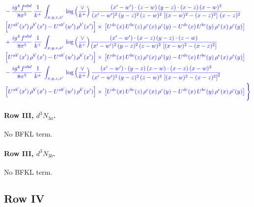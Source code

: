 \documentclass[10pt]{article}
\numberwithin{equation}{section}
\newcommand{\new}[1]{{\color{blue}#1}}
\newcommand{\nc}{\color{blue}}
\begin{document}
\begin{align}
& \nc  - \frac{ig^{4}\, f^{abd}}{8\pi^{5}}\, \frac{1}{k^{+}}\, \int_{x,y,z,x'}\,\new{\log{\left(\frac{\vee}{k^{+}}\right)}}\,\frac{(x'-w')\cdot (z-w)\, (y-z)\cdot (x-z)\, (x-w)^{2}}{(x'-w')^{2}\, (y-z)^{2}\, (z-w)^{2}\,\left[(x-w)^{2} - (x-z)^{2}\right]\, (x-z)^{2}}\, \notag \\ & \nc  \left[U^{ab'}(x')\,\rho^{b'}(x')-U^{ab'}(w')\, \rho^{b'}(x')\right]\times\,\left[U^{de}(x)\,U^{bc}(z)\, \rho^{e}(x)\,\rho^{c}(y)-U^{de}(x)\,U^{bc}(y)\,\rho^{e}(x)\,\rho^{c}(y)\right] \notag \\
& \nc  +\frac{ig^{4}\, f^{abd}}{8\pi^{5}}\, \frac{1}{k^{+}}\, \int_{x,y,z,x'}\,\new{\log{\left(\frac{\vee}{k^{+}}\right)}}\frac{(x'-w')\cdot (x-z)\, (y-z)\cdot (z-w)}{(x'-w')^{2}\, (y-z)^{2}\, (z-w)^{2}\,\left[(x-w)^{2} -(x-z)^{2}\right]}\, \notag \\ & \nc  \left[U^{ab'}(x')\,\rho^{b'}(x')-U^{ab'}(w')\, \rho^{b'}(x')\right]\times\,\left[U^{de}(x)\,U^{bc}(z)\, \rho^{e}(x)\,\rho^{c}(y)-U^{de}(x)\,U^{bc}(y)\,\rho^{e}(x)\,\rho^{c}(y)\right] \notag \\
& \nc  -\frac{ig^{4}\, f^{abd}}{8\pi^{5}}\, \frac{1}{k^{+}}\, \int_{x,y,z,x'}\,\new{\log{\left(\frac{\vee}{k^{+}}\right)}}\,\frac{(x'-w')\cdot (y-z)\, (z-w)\cdot (x-z)\,(x-w)^{2}}{(x'-w')^{2}\, (y-z)^{2}\, (z-w)^{2}\,\left[(x-w)^{2}-(x-z)^{2}\right]^{2}}\, \notag \\ & \nc  \left[U^{ab'}(x')\,\rho^{b'}(x')-U^{ab'}(w')\, \rho^{b'}(x')\right]\times\,\left[U^{de}(x)\,U^{bc}(z)\, \rho^{e}(x)\,\rho^{c}(y)-U^{de}(x)\,U^{bc}(y)\,\rho^{e}(x)\,\rho^{c}(y)\right]\Bigg\} \label{eq:Bnew:G1IIIN2}
\end{align}

\paragraph{Row III, $d^3N_{3a}$.}
No BFKL term.
\paragraph{Row III, $d^3N_{3b}$.}
No BFKL term.
\subsection{Row IV}
\end{document}

